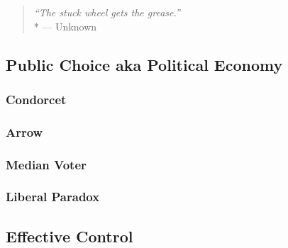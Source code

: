 \begin{quote}
	\emph{``The stuck wheel gets the grease.''}
	\\*
	--- Unknown
\end{quote}

\subsection[Public Choice]{Public Choice aka Political Economy}


\subsubsection{Condorcet}

\subsubsection{Arrow}

\subsubsection{Median Voter}

\subsubsection{Liberal Paradox}

\subsection[Effective Control]{Effective Control}

